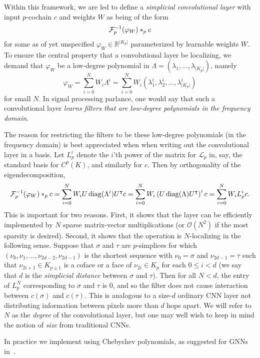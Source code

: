 Within this framework, we are led to define a \emph{simplicial convolutional layer} with input $p$-cochain $c$ and weights $W$ as being of the form
\begin{equation*}
  \mathcal{F}^{-1}_p(\varphi_W)\ast_p c  
\end{equation*}
for some as of yet unspecified $\varphi_W\in\mathbb{R}^{\lvert K_p \rvert}$ parameterized by learnable weights $W$. To ensure the central property that a convolutional layer be localizing, we demand that $\varphi_W$ be a low-degree polynomial in $\Lambda=(\lambda_1, \dotsc, \lambda_{\lvert K_p \rvert})$, namely
\begin{equation*}
  \varphi_W = \sum_{i=0}^N W_i\Lambda^i = \sum_{i=0}^N W_i(\lambda^i_1, \lambda^i_2, \dotsc, \lambda^i_{\lvert K_p \rvert})
\end{equation*}
for small $N$. In signal processing parlance, one would say that such a convolutional layer \emph{learns filters that are low-degree polynomials in the frequency domain}.

The reason for restricting the filters to be these low-degree polynomials (in the frequency domain) is best appreciated when when writing out the convolutional layer in a basis. Let $L^i_p$ denote the $i$'th power of the matrix for $\mathcal{L}_p$ in, say, the standard basis for $C^p(K)$, and similarly for $c$. Then by orthogonality of the eigendecomposition,
\begin{equation}
  \mathcal{F}^{-1}_p(\varphi_W)\ast_p c = \sum_{i=0}^N W_iU\operatorname{diag}(\Lambda^i)U^{\intercal} c = \sum_{i=0}^N W_i\left(U\operatorname{diag}(\Lambda)U^{\intercal}\right)^i c = \sum_{i=0}^NW_iL^i_pc. \label{eq:filter}
\end{equation}
This is important for two reasons. First, it shows that the layer can be efficiently implemented by $N$ sparse matrix-vector multiplications (or $\mathcal{O}(N^2)$ if the most sparsity is desired). Second, it shows that the operation is $N$-localizing in the following sense. Suppose that $\sigma$ and $\tau$ are $p$-simplices for which $(\nu_0, \nu_1, \dotsc, \nu_{2d-2}, \nu_{2d-1})$ is the shortest sequence with $\nu_0=\sigma$ and $\nu_{2d-1}=\tau$ such that $\nu_{2i+1}\in K_{p\pm 1}$ is a coface or a face of $\nu_{2i}\in K_p$ for each $0\leq i < d$ (we say that $d$ is the \emph{simplicial distance} between $\sigma$ and $\tau$). Then for all $N<d$, the entry of $L_p^N$ corresponding to $\sigma$ and $\tau$ is $0$, and so the filter does not cause interaction between $c(\sigma)$ and $c(\tau)$. This is analogous to a size-$d$ ordinary CNN layer not distributing information between pixels more than $d$ hops apart. We will refer to $N$ as the \emph{degree} of the convolutional layer, but one may well wish to keep in mind the notion of \emph{size} from traditional CNNs.

In practice we implement  using Chebyshev polynomials, as suggested for GNNs in~\cite{defferrard2016convolutional}.
